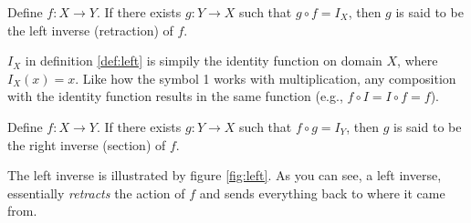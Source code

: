 \begin{define}
\label{def:left}
	Define $f:X\to Y$. If there exists $g: Y\to X$ such that $g\circ f=I_X$, then $g$ is said to be the left inverse (retraction) of $f$.
\end{define}

$I_X$ in definition \eqref{def:left} is simpily the identity function on domain $X$, where $I_X(x)=x$. Like how the symbol 1 works with multiplication, any composition with the identity function results in the same function (e.g., $f\circ I=I\circ f=f$).
\begin{define}
	Define $f:X\to Y$. If there exists $g: Y\to X$ such that $f\circ g=I_Y$, then $g$ is said to be the right inverse (section) of $f$. 
\end{define}

The left inverse is illustrated by figure \eqref{fig:left}. As you can see, a left inverse, essentially \textit{retracts} the action of $f$ and sends everything back to where it came from.
\begin{figure}[h]
\centering
{}
	\caption{}
	\label{fig:left}
\end{figure}

